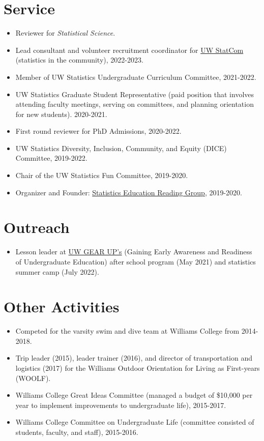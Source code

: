 \documentclass[margin, 10pt]{res} %
\begin{document}
\begin{resume}
{\section{Service}
\begin{itemize}
\item Reviewer for \textit{Statistical Science}.
\item Lead consultant and volunteer recruitment coordinator for \href{https://statcom.stat.washington.edu}{UW StatCom} (statistics in the community), 2022-2023. 
\item Member of UW Statistics Undergraduate Curriculum Committee, 2021-2022. 
 \item UW Statistics Graduate Student Representative (paid position that involves attending faculty meetings, serving on committees, and planning orientation for new students). 2020-2021.
    \item First round reviewer for PhD Admissions, 2020-2022. 
    \item UW Statistics Diversity, Inclusion, Community, and Equity (DICE) Committee, 2019-2022.   
    \item Chair of the UW Statistics Fun Committee, 2019-2020.
    \item Organizer and Founder: \href{https://pearce790.github.io}{Statistics Education Reading Group}, 2019-2020.
 \end{itemize}
 
 
 \section{Outreach}
 \begin{itemize}
    \item Lesson leader at \href{https://depts.washington.edu/gearupac/}{UW GEAR UP's} (Gaining Early Awareness and Readiness of Undergraduate Education) after school program (May 2021) and statistics summer camp (July 2022). 
   \end{itemize}
   
 \section{Other Activities}
\begin{itemize}
\item Competed for the varsity swim and dive team at Williams College from 2014-2018. 
\item Trip leader (2015), leader trainer (2016), and director of transportation and logistics (2017) for the Williams Outdoor Orientation for Living as First-years (WOOLF). 
  \item Williams College Great Ideas Committee (managed a budget of \$10,000 per year to implement improvements to undergraduate life), 2015-2017.
 \item Williams College Committee on Undergraduate Life (committee consisted of students, faculty, and staff), 2015-2016.

\end{itemize}
}
\end{resume}
\end{document}
